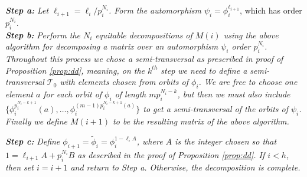 \documentclass[preprint,12pt]{elsarticle}
\def\s{\smallskip}
\newcommand{\cT}{\mathcal{T}}
\renewcommand{\so}{\mathscr{O}}
\theoremstyle{definition}
\theoremstyle{remark}
\renewcommand{\emph}{\textit}
\begin{document}
\noindent\emph{\textbf{Step a:}} \emph{Let $\ell_{i+1} = \ell_i/p_i^{N_i}$.  Form the automorphism $\psi_{i} = \phi_i^{\ell_{i+1}}$}, which has order $p_i^{N_i}$.\\
\noindent\emph{\textbf{Step b:}} \emph{Perform the $N_i$ equitable decompositions of $M(i)$ using the above algorithm for decomposing a matrix over an automorphism $\psi_i$ order $p_i^{N_i}$. Throughout this process we chose a semi-transversal as prescribed in proof of Proposition \ref{prop:dd}, meaning, on the $k^{th}$ step we need to define a semi-transversal $\cT_0$ with elements chosen from orbits of $\phi_i$.  We are free to choose one element $a$ for each orbit of $\phi_i$ of length $mp_i^{N_i-k}$, but then we must also include $\{ \phi_i^{p_i^{N_i-k+1}}(a),\dots,\phi_i^{(m-1)p_i^{N_i-k+1}(a)}\}$ to get a semi-transversal of the orbits of $\psi_i$.  Finally we define $M(i+1)$ to be the resulting matrix of the above algorithm.}


\noindent\emph{\textbf{Step c:}} \emph{Define $\phi_{i+1}=\tilde{\phi}_i=\phi_i^{1-\ell_i A}$, where $A$ is the integer chosen so that $1=\ell_{i+1} A+p_i^{N_i}B$ as described in the proof of Proposition \ref{prop:dd}.
If $i < h$, then set $i = i+1$ and return to \emph{Step a}.  Otherwise, the decomposition is complete.}
\end{document}
